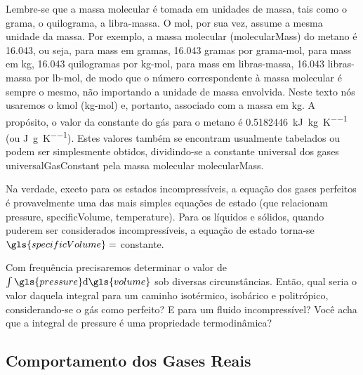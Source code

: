     Lembre-se que a massa molecular é tomada em unidades de massa, tais como o
    grama, o quilograma, a libra-massa. O mol, por sua vez, assume a mesma
    unidade da massa. Por exemplo, a massa molecular (\gls{molecularMass}) do
    metano  é \num{16.043}, ou seja, para \gls{mass} em gramas,
    \num{16.043} gramas por grama-mol, para \gls{mass} em \si{\kilo\gram},
    \num{16.043} quilogramas por kg-mol, para \gls{mass} em libras-massa,
    \num{16.043} libras-massa por lb-mol, de modo que o número correspondente à
    massa molecular é sempre o mesmo, não importando a unidade de massa
    envolvida. Neste texto nós usaremos o \si{\kilo\mol} (kg-mol) e, portanto,
    associado com a massa em \si{\kilo\gram}. A propósito, o valor da constante
    do gás para o metano é \SI{0.5182446}{\kilo\joule\per\kilo\gram\per\kelvin}
    (ou \si{\joule\per\gram\per\kelvin}). Estes valores também se encontram
    usualmente tabelados ou podem ser simplesmente obtidos, dividindo-se a
    constante universal dos gases  \gls{universalGasConstant} pela massa
    molecular \gls{molecularMass}.

    Na verdade, exceto para os estados incompressíveis, a equação dos gases
    perfeitos é provavelmente uma das mais simples equações de estado (que
    relacionam \gls{pressure}, \gls{specificVolume}, \gls{temperature}). Para
    os líquidos e sólidos, quando puderem ser considerados incompressíveis, a
    equação de estado torna-se $\gls{specificVolume} =$ constante.

    Com frequência precisaremos determinar o valor de
    $\int\gls{pressure}\diff{\gls{volume}}$ sob diversas
    circunstâncias. Então, qual seria o valor daquela integral para um caminho
    isotérmico, isobárico e politrópico, considerando-se o gás como perfeito? E
    para um fluido incompressível? Você acha que a integral de
    \gls{pressure} é uma propriedade termodinâmica?


    \subsection{Comportamento dos Gases Reais}

